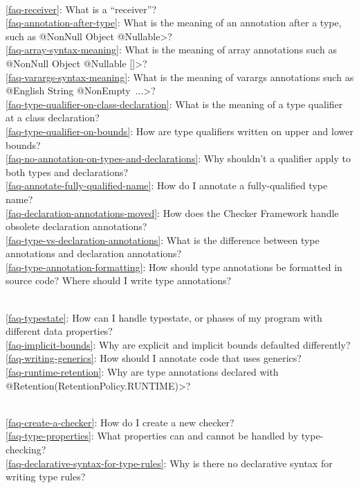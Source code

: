 \\ \ref{faq-receiver}: What is a ``receiver''?
\\ \ref{faq-annotation-after-type}: What is the meaning of an annotation after a type, such as \<@NonNull Object @Nullable>?
\\ \ref{faq-array-syntax-meaning}: What is the meaning of array annotations such as \<@NonNull Object @Nullable []>?
\\ \ref{faq-varargs-syntax-meaning}: What is the meaning of varargs annotations such as \<@English String @NonEmpty~...>?
\\ \ref{faq-type-qualifier-on-class-declaration}: What is the meaning of a type qualifier at a class declaration?
\\ \ref{faq-type-qualifier-on-bounds}: How are type qualifiers written on upper and lower bounds?
\\ \ref{faq-no-annotation-on-types-and-declarations}: Why shouldn't a qualifier apply to both types and declarations?
\\ \ref{faq-annotate-fully-qualified-name}: How do I annotate a
fully-qualified type name?
\\ \ref{faq-declaration-annotations-moved}: How does the Checker Framework handle obsolete declaration annotations?
\\ \ref{faq-type-vs-declaration-annotations}: What is the difference between type annotations and declaration annotations?
\\ \ref{faq-type-annotation-formatting}: How should type annotations be formatted in source code?  Where should I write type annotations?

\\ \ref{faq-typestate}: How can I handle typestate, or phases of my program with different data properties?
\\ \ref{faq-implicit-bounds}: Why are explicit and implicit bounds defaulted differently?
\\ \ref{faq-writing-generics}: How should I annotate code that uses generics?
\\ \ref{faq-runtime-retention}: Why are type annotations declared with \<@Retention(RetentionPolicy.RUNTIME)>?

\\ \ref{faq-create-a-checker}: How do I create a new checker?
\\ \ref{faq-type-properties}: What properties can and cannot be handled by type-checking?
\\ \ref{faq-declarative-syntax-for-type-rules}: Why is there no declarative syntax for writing type rules?

